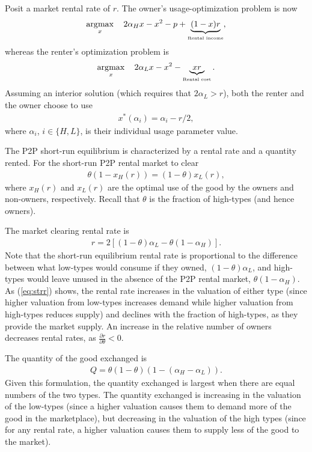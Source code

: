 \documentclass[12pt]{article}
\DeclareMathOperator*{\argmax}{\arg\!\max}
\begin{document}
Posit a market rental rate of $r$. 
The owner's usage-optimization problem is now 
\begin{align}
\argmax_x \quad 2\alpha_H x - x^2 -p + \underbrace{(1-x)r}_{\mbox{{\tiny Rental income}}},   \nonumber 
\end{align} 
whereas the renter's optimization problem is 
\begin{align}
\argmax_x \quad 2 \alpha_L x - x^2 - \underbrace{xr}_{\mbox{{\tiny Rental cost}}}.  \nonumber
\end{align} 
Assuming an interior solution (which requires that $2\alpha_L > r$), both the renter and the owner choose to use
\begin{align}
x^*(\alpha_i) = \alpha_i - r/2, 
\end{align} 
where $\alpha_i$, $i \in \{H,L\}$, is their individual usage parameter value. 

The P2P short-run equilibrium is characterized by a rental rate and a quantity rented. 
For the short-run P2P rental market to clear 
\begin{align}
  \theta \left( 1 - x_H(r) \right) = (1-\theta) x_L(r),
\end{align}
where $x_H(r)$ and $x_L(r)$ are the optimal use of the good by the owners and non-owners, respectively.
Recall that $\theta$ is the fraction of high-types (and hence owners).

The market clearing rental rate is 
\begin{align} \label{eq:strr} 
r = 2\left[ (1-\theta)\alpha_L - \theta (1-\alpha_H) \right]. 
\end{align}
Note that the short-run equilibrium rental rate is proportional to the difference between what low-types would consume if they owned, $(1-\theta)\alpha_L$, and high-types would leave unused in the absence of the P2P rental market, $\theta (1-\alpha_H)$. 
As (\ref{eq:strr}) shows, the rental rate increases in the valuation of either type (since higher valuation from low-types increases demand while higher valuation from high-types reduces supply) and declines with the fraction of high-types, as they provide the market supply. 
An increase in the relative number of owners decreases rental rates, as $\frac{\partial r}{\partial \theta} < 0$. 

The quantity of the good exchanged is 
\begin{align} \label{eq:qty}
  Q = \theta (1-\theta) \left(1 - (\alpha_H - \alpha_L)\right).
\end{align} 
Given this formulation, the quantity exchanged is largest when there are equal numbers of the two types.
The quantity exchanged is increasing in the valuation of the low-types (since a higher valuation causes them to demand more of the good in the marketplace), but decreasing in the valuation of the high types (since for any rental rate, a higher valuation causes them to supply less of the good to the market). 
 
\end{document}
